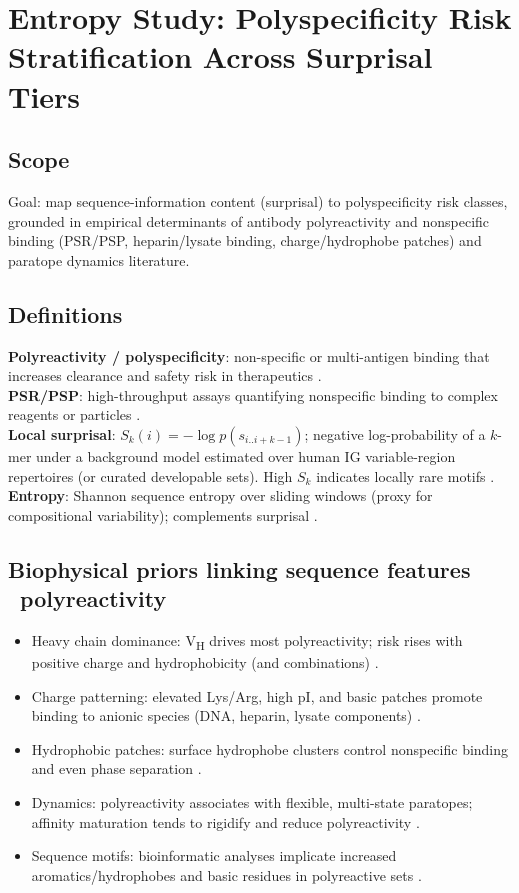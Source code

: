 \section*{Entropy Study: Polyspecificity Risk Stratification Across Surprisal Tiers}

\subsection*{Scope}
Goal: map sequence-information content (surprisal) to polyspecificity risk classes, grounded in empirical determinants of antibody polyreactivity and nonspecific binding (PSR/PSP, heparin/lysate binding, charge/hydrophobe patches) and paratope dynamics literature.

\subsection*{Definitions}
\textbf{Polyreactivity / polyspecificity}: non-specific or multi-antigen binding that increases clearance and safety risk in therapeutics \cite{Cunningham2021,Herling2023,Chen2024}.\\
\textbf{PSR/PSP}: high-throughput assays quantifying nonspecific binding to complex reagents or particles \cite{Xu2013,Makowski2021}.\\
\textbf{Local surprisal}: $S_k(i)=-\log p(s_{i..i+k-1})$; negative log-probability of a $k$-mer under a background model estimated over human IG variable-region repertoires (or curated developable sets). High $S_k$ indicates locally rare motifs \cite{Humphrey2020}.\\
\textbf{Entropy}: Shannon sequence entropy over sliding windows (proxy for compositional variability); complements surprisal \cite{Anashkina2021}.

\subsection*{Biophysical priors linking sequence features \textrightarrow\ polyreactivity}
\begin{itemize}\setlength\itemsep{2pt}
\item Heavy chain dominance: V\textsubscript{H} drives most polyreactivity; risk rises with positive charge and hydrophobicity (and combinations) \cite{Chen2024}.
\item Charge patterning: elevated Lys/Arg, high pI, and basic patches promote binding to anionic species (DNA, heparin, lysate components) \cite{Lecerf2023,Cunningham2021}.
\item Hydrophobic patches: surface hydrophobe clusters control nonspecific binding and even phase separation \cite{Ausserwoger2023}.
\item Dynamics: polyreactivity associates with flexible, multi-state paratopes; affinity maturation tends to rigidify and reduce polyreactivity \cite{Shehata2019,FQ2020states,FQ2020rigid,Jeliazkov2018,Guthmiller2020,Prigent2018}.
\item Sequence motifs: bioinformatic analyses implicate increased aromatics/hydrophobes and basic residues in polyreactive sets \cite{Boughter2020,Lecerf2023}.
\end{itemize}

